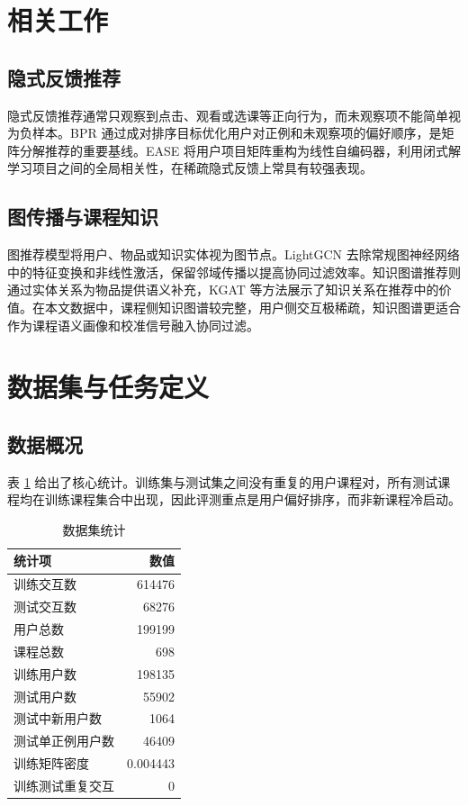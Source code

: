 \documentclass[10pt,twoside,twocolumn]{article}
\begin{document}
\section{相关工作}
\subsection{隐式反馈推荐}
隐式反馈推荐通常只观察到点击、观看或选课等正向行为，而未观察项不能简单视为负样本。BPR 通过成对排序目标优化用户对正例和未观察项的偏好顺序\cite{rendle2009bpr}，是矩阵分解推荐的重要基线。EASE 将用户项目矩阵重构为线性自编码器，利用闭式解学习项目之间的全局相关性，在稀疏隐式反馈上常具有较强表现\cite{steck2019ease}。

\subsection{图传播与课程知识}
图推荐模型将用户、物品或知识实体视为图节点。LightGCN 去除常规图神经网络中的特征变换和非线性激活，保留邻域传播以提高协同过滤效率\cite{he2020lightgcn}。知识图谱推荐则通过实体关系为物品提供语义补充，KGAT 等方法展示了知识关系在推荐中的价值\cite{wang2019kgat}。在本文数据中，课程侧知识图谱较完整，用户侧交互极稀疏，知识图谱更适合作为课程语义画像和校准信号融入协同过滤。

\section{数据集与任务定义}
\subsection{数据概况}
表 \ref{tab:data} 给出了核心统计。训练集与测试集之间没有重复的用户课程对，所有测试课程均在训练课程集合中出现，因此评测重点是用户偏好排序，而非新课程冷启动。

\begin{table}[htbp]
  \centering
  \caption{数据集统计}
  \label{tab:data}
  \begin{tabular}{lr}
    \toprule
    统计项 & 数值 \\
    \midrule
    训练交互数 & 614476 \\
    测试交互数 & 68276 \\
    用户总数 & 199199 \\
    课程总数 & 698 \\
    训练用户数 & 198135 \\
    测试用户数 & 55902 \\
    测试中新用户数 & 1064 \\
    测试单正例用户数 & 46409 \\
    训练矩阵密度 & 0.004443 \\
    训练测试重复交互 & 0 \\
    \bottomrule
  \end{tabular}
\end{table}
\end{document}
